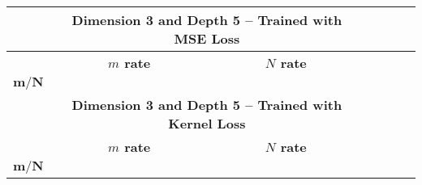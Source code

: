\documentclass{article}
\newcommand{\Is}{N}
\begin{document}
    \begin{tabular}{|c|cccc|cccc|cccc|}
        \hline
        & \multicolumn{8}{c|}{\bf Dimension 3 and Depth 5 -- Trained with MSE Loss} \\ \hline
        & \multicolumn{4}{c|}{\bf $m$ rate} 
        & \multicolumn{4}{c|}{\bf $N$ rate} \\ \hline
        {\bf $\boldsymbol{m}/\boldsymbol{\Is}$} %
         \\
        \hline
        \hline
        & \multicolumn{8}{c|}{\bf Dimension 3 and Depth 5 -- Trained with Kernel Loss} \\ \hline
        & \multicolumn{4}{c|}{\bf $m$ rate} 
        & \multicolumn{4}{c|}{\bf $N$ rate} \\ \hline
        {\bf $\boldsymbol{m}/\boldsymbol{\Is}$} %
         \\
        \hline
    \end{tabular}
\end{document}
